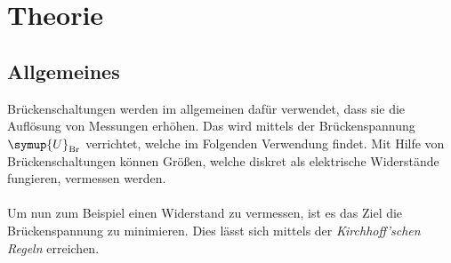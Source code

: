 \section{Theorie}
\label{sec:theorie}
\subsection{Allgemeines}
Brückenschaltungen werden im allgemeinen dafür verwendet,
dass sie die Auflösung von Messungen erhöhen.
Das wird mittels der Brückenspannung $\symup{U}_\text{Br}$
verrichtet, welche im Folgenden Verwendung findet.
Mit Hilfe von Brückenschaltungen können Größen, welche diskret als
elektrische Widerstände fungieren, vermessen werden.
\\
\\
Um nun zum Beispiel einen Widerstand zu vermessen, ist es das Ziel die
Brückenspannung zu minimieren.
Dies lässt sich mittels der \emph{Kirchhoff'schen Regeln} erreichen.
